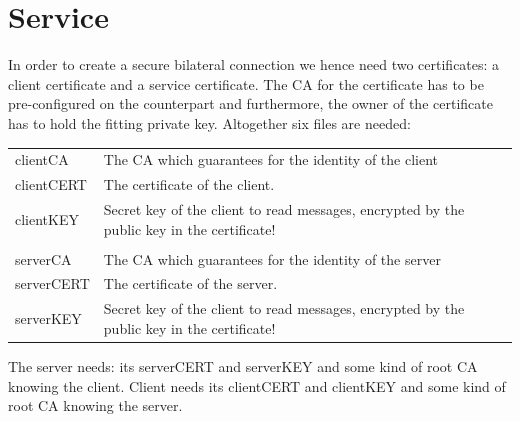 \clearpage
\section{Service}

In order to create a secure bilateral connection we hence need two certificates: a client certificate and a service certificate.
The CA for the certificate has to be pre-configured on the counterpart and furthermore, the owner of the certificate has to hold the fitting private key. 
Altogether six files are needed:
\begin{tabular}{l@{-}p{9cm}}
clientCA   & The CA which guarantees for the identity of the client \\
clientCERT & The certificate of the client. \\
clientKEY  & Secret key of the client to read messages, encrypted by the public key in the certificate! \\
\\
serverCA   & The CA which guarantees for the identity of the server \\
serverCERT & The certificate of the server. \\
serverKEY  & Secret key of the client to read messages, encrypted by the public key in the certificate! \\
\end{tabular}

The server needs: its  serverCERT and serverKEY and some kind of root CA knowing the client.
Client needs its clientCERT and clientKEY and some kind of root CA knowing the server.


%
%

